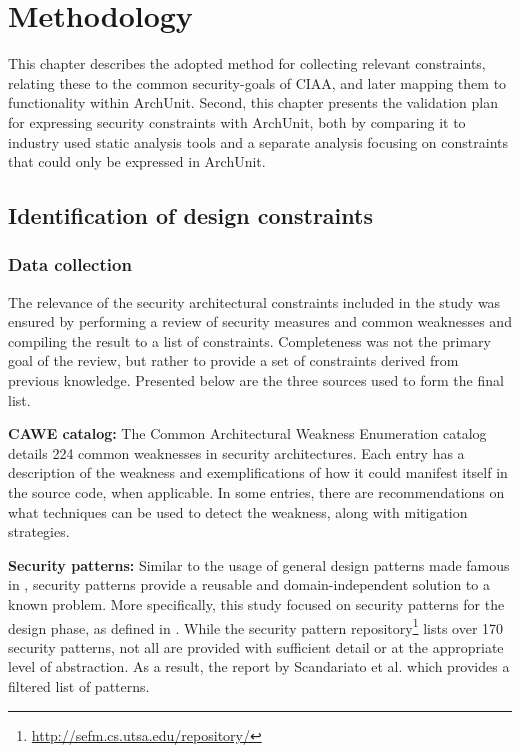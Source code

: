 \chapter{Methodology}

This chapter describes the adopted method for collecting relevant constraints, relating these to the common security-goals of CIAA, and later mapping them to functionality within ArchUnit. Second, this chapter presents the validation plan for expressing security constraints with ArchUnit, both by comparing it to industry used static analysis tools and a separate analysis focusing on constraints that could only be expressed in ArchUnit.

\section{Identification of design constraints}

\subsection{Data collection} \label{sec:data_collection}

The relevance of the security architectural constraints included in the study was ensured by performing a review of security measures and common weaknesses and compiling the result to a list of constraints. Completeness was not the primary goal of the review, but rather to provide a set of constraints derived from previous knowledge. Presented below are the three sources used to form the final list. 

\textbf{CAWE catalog:}
The Common Architectural Weakness Enumeration catalog \cite{santos_catalog_2017} details 224 common weaknesses in security architectures. Each entry has a description of the weakness and exemplifications of how it could manifest itself in the source code, when applicable. In some entries, there are recommendations on what techniques can be used to detect the weakness, along with mitigation strategies.

\textbf{Security patterns:}
Similar to the usage of general design patterns made famous in \cite{gamma_design_1995}, security patterns provide a reusable and domain-independent solution to a known problem. More specifically, this study focused on security patterns for the design phase, as defined in \cite{yoshioka_survey_2008}. While the security pattern repository\footnote{\url{http://sefm.cs.utsa.edu/repository/}} lists over 170 security patterns, not all are provided with sufficient detail or at the appropriate level of abstraction. As a result, the report by Scandariato et al. \cite{scandariato_system_2006}  which provides a filtered list of patterns.


